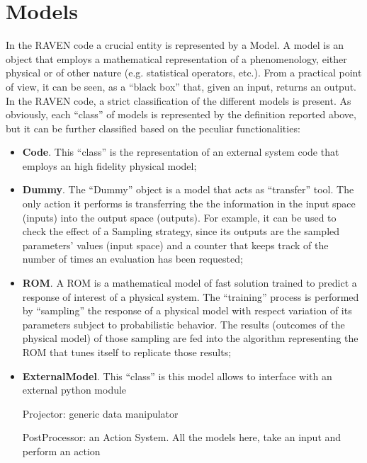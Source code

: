\section{Models  \\ \vspace{2 mm} {\small }}
\label{sec:models}
In the RAVEN code a crucial entity is represented by a Model. A model is an object that employs a mathematical representation of a phenomenology, either physical or of other nature (e.g. statistical operators, etc.). From a practical point of view, it can be seen, as a ``black box'' that, given an input, returns an output. 
\\ In the RAVEN code, a strict  classification of the different models is present. As obviously, each ``class'' of models is represented by the definition reported above, but it can be further classified based on the peculiar functionalities:
\begin{itemize}
\item \textbf{Code}. This ``class'' is the representation of an external system code that employs an high fidelity physical model;
\item \textbf{Dummy}. The ``Dummy'' object is a model that acts as ``transfer'' tool. The only action it performs is transferring the the information in the input space (inputs) into the output space (outputs). For example, it can be used to check the effect of a Sampling strategy, since its outputs are the sampled parameters' values (input space) and a counter that keeps track of the number of times an evaluation has been requested; 
\item \textbf{ROM}. A ROM is a mathematical model of fast solution trained to predict a response of interest of a physical system. The ``training'' process is performed by “sampling” the response of a physical model with respect variation of its parameters subject to probabilistic behavior. The results (outcomes of the physical model) of those sampling are fed into the algorithm representing the ROM that tunes itself to replicate those results;
\item \textbf{ExternalModel}. This ``class'' is  this model allows to interface with an external python module

\item [Projector:] generic data manipulator
\item [PostProcessor:] an Action System. All the models here, take an input and perform an action
\end{itemize}

